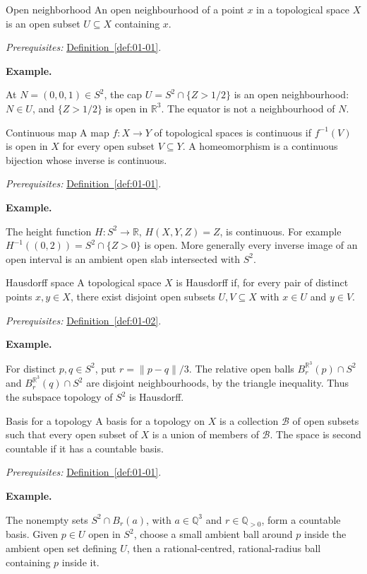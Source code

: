 \documentclass[11pt]{article}
\makeatletter
\newcommand{\R}{\mathbb R}
\newcounter{definition}
\newcommand{\Q}{\mathbb Q}
\newcommand{\exampleheading}{\par\medskip\textbf{Example.}\par\smallskip}
\newcommand{\currentdefinition}[1]{\protected@edef\@currentlabel{#1}}
\makeatother
\begin{document}
\begin{definitionbox}{Open neighborhood}
\currentdefinition{\thedefinition}
\label{def:01-02}
An open neighbourhood of a point $x$ in a topological space $X$ is an open subset $U\subseteq X$ containing $x$.

\smallskip
\textit{Prerequisites:} \hyperref[def:01-01]{Definition~\ref*{def:01-01}}.

\exampleheading
At $N=(0,0,1)\in S^2$, the cap $U=S^2\cap\{Z>1/2\}$ is an open neighbourhood: $N\in U$, and $\{Z>1/2\}$ is open in $\R^3$. The equator is not a neighbourhood of $N$.
\end{definitionbox}

\begin{definitionbox}{Continuous map}
\currentdefinition{\thedefinition}
\label{def:06-01}
A map $f:X\to Y$ of topological spaces is continuous if $f^{-1}(V)$ is open in $X$ for every open subset $V\subseteq Y$. A homeomorphism is a continuous bijection whose inverse is continuous.

\smallskip
\textit{Prerequisites:} \hyperref[def:01-01]{Definition~\ref*{def:01-01}}.

\exampleheading
The height function $H:S^2\to\R$, $H(X,Y,Z)=Z$, is continuous. For example $H^{-1}((0,2))=S^2\cap\{Z>0\}$ is open. More generally every inverse image of an open interval is an ambient open slab intersected with $S^2$.
\end{definitionbox}

\begin{definitionbox}{Hausdorff space}
\currentdefinition{\thedefinition}
\label{def:06-02}
A topological space $X$ is Hausdorff if, for every pair of distinct points $x,y\in X$, there exist disjoint open subsets $U,V\subseteq X$ with $x\in U$ and $y\in V$.

\smallskip
\textit{Prerequisites:} \hyperref[def:01-02]{Definition~\ref*{def:01-02}}.

\exampleheading
For distinct $p,q\in S^2$, put $r=\|p-q\|/3$. The relative open balls $B_r^{\R^3}(p)\cap S^2$ and $B_r^{\R^3}(q)\cap S^2$ are disjoint neighbourhoods, by the triangle inequality. Thus the subspace topology of $S^2$ is Hausdorff.
\end{definitionbox}

\begin{definitionbox}{Basis for a topology}
\currentdefinition{\thedefinition}
\label{def:06-03}
A basis for a topology on $X$ is a collection $\mathcal B$ of open subsets such that every open subset of $X$ is a union of members of $\mathcal B$. The space is second countable if it has a countable basis.

\smallskip
\textit{Prerequisites:} \hyperref[def:01-01]{Definition~\ref*{def:01-01}}.

\exampleheading
The nonempty sets $S^2\cap B_r(a)$, with $a\in\Q^3$ and $r\in\Q_{>0}$, form a countable basis. Given $p\in U$ open in $S^2$, choose a small ambient ball around $p$ inside the ambient open set defining $U$, then a rational-centred, rational-radius ball containing $p$ inside it.
\end{definitionbox}
\end{document}
